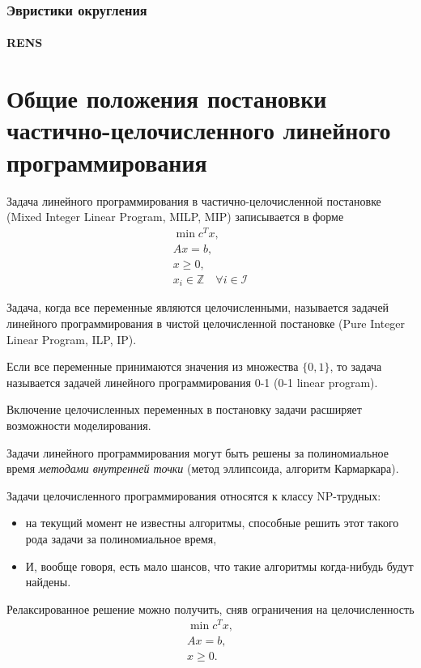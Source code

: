 \documentclass[%
	11pt,
	a4paper,
	utf8,
		]{article}
\begin{document}
\subsubsection{Эвристики округления}

\paragraph{RENS} 


\section{Общие положения постановки частично-целочисленного линейного программирования}

Задача линейного программирования в частично-целочисленной постановке (Mixed Integer Linear Program, MILP, MIP) записывается в форме
\begin{align*}
	\min c^T x,\\
	Ax = b,\\
	x \geqslant 0,\\
	x_i \in \mathbb{Z} \quad \forall i \in \mathcal{I}
\end{align*}

Задача, когда все переменные являются целочисленными, называется задачей линейного программирования в чистой целочисленной постановке (Pure Integer Linear Program, ILP, IP).

Если все переменные принимаются значения из множества $ \{ 0, 1 \} $, то задача называется задачей линейного программирования 0-1 (0-1 linear program).

Включение целочисленных переменных в постановку задачи расширяет возможности моделирования.

Задачи линейного программирования могут быть решены за полиномиальное время \emph{методами внутренней точки} (метод эллипсоида, алгоритм Кармаркара). 

Задачи целочисленного программирования относятся к классу NP-трудных:
\begin{itemize}
	\item на текущий момент не известны алгоритмы, способные решить этот такого рода задачи за полиномиальное время,
	
	\item И, вообще говоря, есть мало шансов, что такие алгоритмы когда-нибудь будут найдены.
\end{itemize}

Релаксированное решение можно получить, сняв ограничения на целочисленность
\begin{align*}
	\min c^T x,\\
	Ax = b,\\
	x \geqslant 0.
\end{align*}
\end{document}
